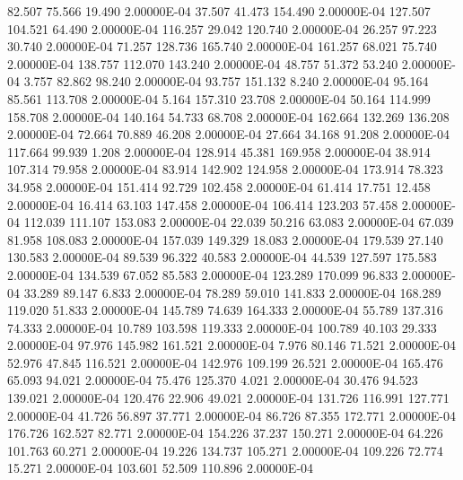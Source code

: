     82.507    75.566    19.490  2.00000E-04
    37.507    41.473   154.490  2.00000E-04
   127.507   104.521    64.490  2.00000E-04
   116.257    29.042   120.740  2.00000E-04
    26.257    97.223    30.740  2.00000E-04
    71.257   128.736   165.740  2.00000E-04
   161.257    68.021    75.740  2.00000E-04
   138.757   112.070   143.240  2.00000E-04
    48.757    51.372    53.240  2.00000E-04
     3.757    82.862    98.240  2.00000E-04
    93.757   151.132     8.240  2.00000E-04
    95.164    85.561   113.708  2.00000E-04
     5.164   157.310    23.708  2.00000E-04
    50.164   114.999   158.708  2.00000E-04
   140.164    54.733    68.708  2.00000E-04
   162.664   132.269   136.208  2.00000E-04
    72.664    70.889    46.208  2.00000E-04
    27.664    34.168    91.208  2.00000E-04
   117.664    99.939     1.208  2.00000E-04
   128.914    45.381   169.958  2.00000E-04
    38.914   107.314    79.958  2.00000E-04
    83.914   142.902   124.958  2.00000E-04
   173.914    78.323    34.958  2.00000E-04
   151.414    92.729   102.458  2.00000E-04
    61.414    17.751    12.458  2.00000E-04
    16.414    63.103   147.458  2.00000E-04
   106.414   123.203    57.458  2.00000E-04
   112.039   111.107   153.083  2.00000E-04
    22.039    50.216    63.083  2.00000E-04
    67.039    81.958   108.083  2.00000E-04
   157.039   149.329    18.083  2.00000E-04
   179.539    27.140   130.583  2.00000E-04
    89.539    96.322    40.583  2.00000E-04
    44.539   127.597   175.583  2.00000E-04
   134.539    67.052    85.583  2.00000E-04
   123.289   170.099    96.833  2.00000E-04
    33.289    89.147     6.833  2.00000E-04
    78.289    59.010   141.833  2.00000E-04
   168.289   119.020    51.833  2.00000E-04
   145.789    74.639   164.333  2.00000E-04
    55.789   137.316    74.333  2.00000E-04
    10.789   103.598   119.333  2.00000E-04
   100.789    40.103    29.333  2.00000E-04
    97.976   145.982   161.521  2.00000E-04
     7.976    80.146    71.521  2.00000E-04
    52.976    47.845   116.521  2.00000E-04
   142.976   109.199    26.521  2.00000E-04
   165.476    65.093    94.021  2.00000E-04
    75.476   125.370     4.021  2.00000E-04
    30.476    94.523   139.021  2.00000E-04
   120.476    22.906    49.021  2.00000E-04
   131.726   116.991   127.771  2.00000E-04
    41.726    56.897    37.771  2.00000E-04
    86.726    87.355   172.771  2.00000E-04
   176.726   162.527    82.771  2.00000E-04
   154.226    37.237   150.271  2.00000E-04
    64.226   101.763    60.271  2.00000E-04
    19.226   134.737   105.271  2.00000E-04
   109.226    72.774    15.271  2.00000E-04
   103.601    52.509   110.896  2.00000E-04
